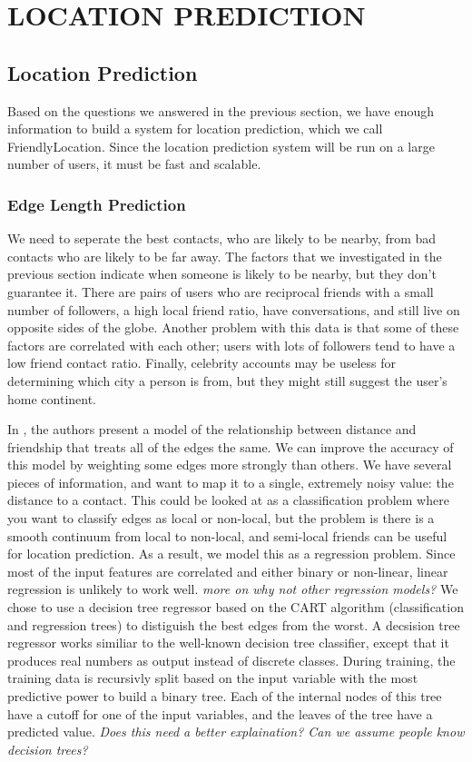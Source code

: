 \ifdefined\THESIS
    \chapter{\uppercase{Location Prediction}}
\else
    \section{Location Prediction}
\fi

Based on the questions we answered in the previous section, we have enough
information to build a system for location prediction, which we call
FriendlyLocation.
Since the location prediction system will be run on a large number of users,
it must be fast and scalable.

\subsection{Edge Length Prediction}

We need to seperate the best contacts, who are likely to be nearby, from
bad contacts who are likely to be far away.
%
The factors that we investigated in the previous section indicate when someone
is likely to be nearby, but they don't guarantee it.
%
There are pairs of users who are reciprocal friends with a small number of
followers, a high local friend ratio, have conversations, and still live on
opposite sides of the globe.
%
Another problem with this data is that some of these factors are correlated
with each other; users with lots of followers tend to have a low friend contact
ratio.
%
Finally, celebrity accounts may be useless for determining which city a person
is from, but they might still suggest the user's home continent.

In \cite{backstrom2010find}, the authors present a model of the relationship
between distance and friendship that treats all of the edges the same.
%
We can improve the accuracy of this model by weighting some edges more strongly
than others.
%
We have several pieces of information, and want to map it to a single, extremely
noisy value: the distance to a contact.
%
This could be looked at as a classification problem where you want to classify
edges as local or non-local, but the problem is there is a smooth continuum
from local to non-local, and semi-local friends can be useful for location
prediction.
%
As a result, we model this as a regression problem.
%
Since most of the input features are correlated and either binary or non-linear,
linear regression is unlikely to work well.
%
\emph{more on why not other regression models?}
%
We chose to use a decision tree regressor based on the CART algorithm
(classification and regression trees) to distiguish the best edges from the
worst.
%
A decsision tree regressor works similiar to the well-known decision tree
classifier, except that it produces real numbers as output instead of discrete
classes.
%
During training, the training data is recursivly split based on the input
variable with the most predictive power to build a binary tree.
%
Each of the internal nodes of this tree have a cutoff for one of the input
variables, and the leaves of the tree have a predicted value.
%
\emph{Does this need a better explaination? Can we assume people know decision
trees?}

